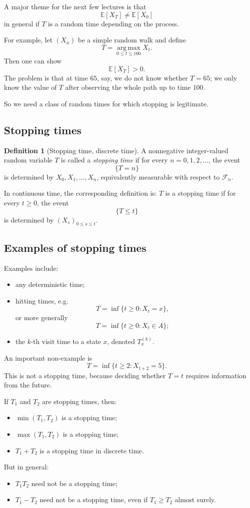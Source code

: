 \documentclass[11pt]{article}
\theoremstyle{definition}
\newtheorem{definition}[theorem]{Definition}
\begin{document}
A major theme for the next few lectures is that
\[
\mathbb E[X_T]\neq \mathbb E[X_0]
\]
in general if \(T\) is a random time depending on the process.

For example, let \((X_n)\) be a simple random walk and define
\[
T=\operatorname*{arg\,max}_{0\le t\le 100} X_t.
\]
Then one can show
\[
\mathbb E[X_T]>0.
\]
The problem is that at time \(65\), say, we do not know whether \(T=65\); we only know the value of \(T\) after observing the whole path up to time \(100\).

So we need a class of random times for which stopping is legitimate.

\subsection{Stopping times}

\begin{definition}[Stopping time, discrete time]
A nonnegative integer-valued random variable \(T\) is called a \emph{stopping time} if for every \(n=0,1,2,\dots\), the event
\[
\{T=n\}
\]
is determined by \(X_0,X_1,\dots,X_n\), equivalently measurable with respect to \(\mathcal F_n\).
\end{definition}

In continuous time, the corresponding definition is: \(T\) is a stopping time if for every \(t\ge 0\), the event
\[
\{T\le t\}
\]
is determined by \((X_s)_{0\le s\le t}\).

\subsection{Examples of stopping times}

Examples include:
\begin{itemize}[leftmargin=2em]
    \item any deterministic time;
    \item hitting times, e.g.
    \[
    T=\inf\{t\ge 0:X_t=x\},
    \]
    or more generally
    \[
    T=\inf\{t\ge 0:X_t\in A\};
    \]
    \item the \(k\)-th visit time to a state \(x\), denoted \(T_x^{(k)}\).
\end{itemize}

An important non-example is
\[
T=\inf\{t\ge 2:X_{t+2}=5\}.
\]
This is not a stopping time, because deciding whether \(T=t\) requires information from the future.

If \(T_1\) and \(T_2\) are stopping times, then:
\begin{itemize}[leftmargin=2em]
    \item \(\min(T_1,T_2)\) is a stopping time;
    \item \(\max(T_1,T_2)\) is a stopping time;
    \item \(T_1+T_2\) is a stopping time in discrete time.
\end{itemize}
But in general:
\begin{itemize}[leftmargin=2em]
    \item \(T_1T_2\) need not be a stopping time;
    \item \(T_1-T_2\) need not be a stopping time, even if \(T_1\ge T_2\) almost surely.
\end{itemize}
\end{document}
